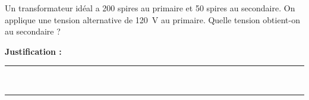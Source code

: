 Un transformateur idéal a 200 spires au primaire et 50 spires au secondaire. On applique une tension alternative de \qty{120}{V} au primaire. Quelle tension obtient-on au secondaire ?

\choices

\noindent\textbf{Justification :} \hrulefill \\[2.5ex]
\rule{\linewidth}{0.4pt} \\[2.5ex]
\rule{\linewidth}{0.4pt}
\vfill
